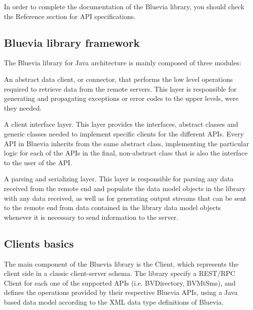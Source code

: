In order to complete the documentation of the Bluevia library, you should check the Reference section for API specifications.\hypertarget{main_programming_guidelines_framework_sec}{}\subsection{Bluevia library framework}\label{main_programming_guidelines_framework_sec}
The Bluevia library for Java architecture is mainly composed of three modules:


\begin{DoxyItemize}
\item An abstract data client, or connector, that performs the low level operations required to retrieve data from the remote servers. This layer is responsible for generating and propagating exceptions or error codes to the upper levels, were they needed.


\item A client interface layer. This layer provides the interfaces, abstract classes and generic classes needed to implement specific clients for the different APIs. Every API in Bluevia inherits from the same abstract class, implementing the particular logic for each of the APIs in the final, non-\/abstract class that is also the interface to the user of the API.


\item A parsing and serializing layer. This layer is responsible for parsing any data received from the remote end and populate the data model objects in the library with any data received, as well as for generating output streams that can be sent to the remote end from data contained in the library data model objects whenever it is necessary to send information to the server.


\end{DoxyItemize}\hypertarget{main_programming_guidelines_clients_basics_sec}{}\subsection{Clients basics}\label{main_programming_guidelines_clients_basics_sec}
The main component of the Bluevia library is the Client, which represents the client side in a classic client-\/server schema. The library specify a REST/RPC Client for each one of the supported APIs (i.e. BVDirectory, BVMtSms), and defines the operations provided by their respective Bluevia APIs, using a Java based data model according to the XML data type definitions of Bluevia.

